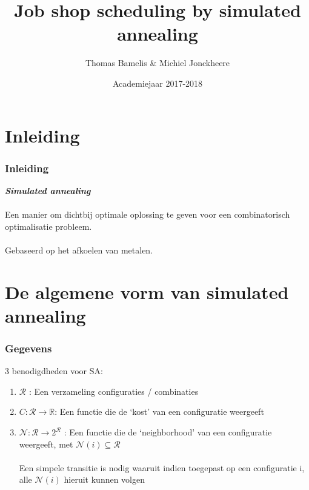 \documentclass
   [kulak] %
   {kulakbeamer}
\title[Simulated annealing]{Job shop scheduling by simulated annealing}
\author[T. Bamelis \& M. Jonckheere]{Thomas Bamelis \& Michiel Jonckheere}
\institute[Kulak]{KU Leuven Kulak}
\date{Academiejaar 2017-2018}
\begin{document}
\begin{titleframe}
\titlepage
\end{titleframe}

\begin{outlineframe}[Overzicht]
\tableofcontents
\end{outlineframe}


\section{Inleiding}

\begin{frame}
\frametitle{Inleiding}
\textbf{\textit{Simulated annealing}} \\~\\
Een manier om dichtbij optimale oplossing te geven voor een combinatorisch optimalisatie probleem.\\~\\
\pause
Gebaseerd op het afkoelen van metalen. 
\end{frame}

\section[SA algemeen]{De algemene vorm van simulated annealing}

\begin{frame}
\frametitle{Gegevens}
3 benodigdheden voor SA:

\begin{enumerate}
	\item \textbf{$\mathscr{R}$} : Een verzameling configuraties / combinaties
	\item \textbf{$C: \mathscr{R} \rightarrow \mathbb{R}$}: Een functie die de `kost' van een configuratie weergeeft
	\item \textbf{$\mathscr{N}: \mathscr{R} \rightarrow 2^\mathscr{R}$} : Een functie die de `neighborhood' van een configuratie weergeeft, met $\mathscr{N}(i) \subseteq \mathscr{R}$ \\~\\
	Een simpele transitie is nodig waaruit indien toegepast op een configuratie i, alle $\mathscr{N}(i)$ hieruit kunnen volgen
\end{enumerate}
\end{frame}
\end{document}
